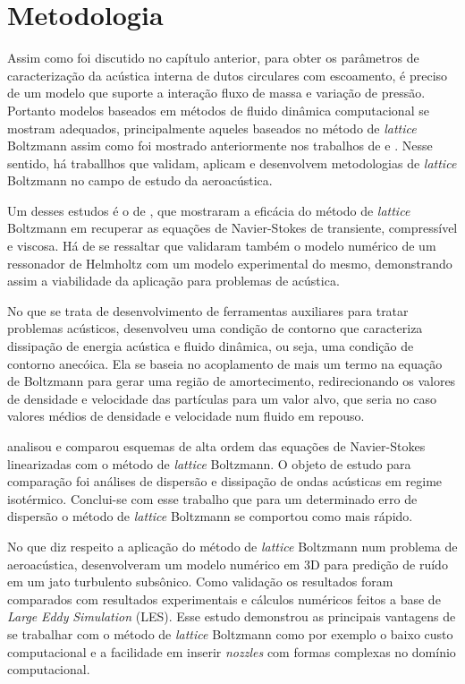 \chapter{Metodologia}

Assim como foi discutido no capítulo anterior, para obter os parâmetros de caracterização da acústica interna de dutos circulares com escoamento, é preciso de um modelo que suporte a interação fluxo de massa e variação de pressão. Portanto modelos baseados em métodos de fluido dinâmica computacional se mostram adequados, principalmente aqueles baseados no método de \textit{lattice} Boltzmann assim como foi mostrado anteriormente nos trabalhos de  e . Nesse sentido, há traballhos que validam, aplicam e desenvolvem metodologias de \textit{lattice} Boltzmann no campo de estudo da aeroacústica.

Um desses estudos é o de , que mostraram a eficácia do método de \textit{lattice} Boltzmann em recuperar as equações de Navier-Stokes de transiente, compressível e viscosa. Há de se ressaltar que validaram também o modelo numérico de um ressonador de Helmholtz com um modelo experimental do mesmo, demonstrando assim a viabilidade da aplicação para problemas de acústica.

No que se trata de desenvolvimento de ferramentas auxiliares para tratar problemas acústicos,  desenvolveu uma condição de contorno que caracteriza dissipação de energia acústica e fluido dinâmica, ou seja, uma condição de contorno anecóica. Ela se baseia no acoplamento de mais um termo na equação de Boltzmann para gerar uma região de amortecimento, redirecionando os valores de densidade e velocidade das partículas para um valor alvo, que seria no caso valores médios de densidade e velocidade num fluido em repouso.

 analisou e comparou esquemas de alta ordem das equações de Navier-Stokes linearizadas com o método de \textit{lattice} Boltzmann. O objeto de estudo para comparação foi análises de dispersão e dissipação de ondas acústicas em regime isotérmico. Conclui-se com esse trabalho que para um determinado erro de dispersão o método de \textit{lattice} Boltzmann se comportou como mais rápido.

No que diz respeito a aplicação do método de \textit{lattice} Boltzmann num problema de aeroacústica,  desenvolveram um modelo numérico em 3D para predição de ruído em um jato turbulento subsônico. Como validação os resultados foram comparados com resultados experimentais e cálculos numéricos feitos a base de \textit{Large} \textit{Eddy} \textit{Simulation} (LES). Esse estudo demonstrou as principais vantagens de se trabalhar com o método de \textit{lattice} Boltzmann como por exemplo o baixo custo computacional e a facilidade em inserir \textit{nozzles} com formas complexas no domínio computacional.

